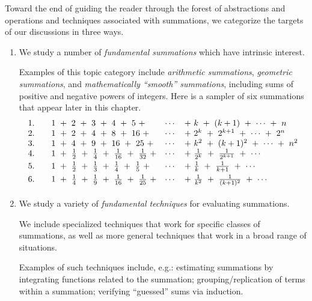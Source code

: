 \bigskip

Toward the end of guiding the reader through the forest of abstractions and operations and techniques associated with summations, we categorize the targets of our discussions in three ways.
\begin{enumerate}
\item
We study a number of {\it fundamental summations} which have intrinsic interest.

\smallskip

Examples of this topic category include {\it arithmetic summations}, {\it geometric summations}, and {\it mathematically ``smooth'' summations}, including sums of positive and negative powers of integers.  Here is a sampler of six summations that appear later in this chapter.
\[
\begin{array}{lclcl}
1.  & &
1 \ + \ 2 \ + \ 3 \ + \ 4 \ + \ 5 \ + & \cdots & + \ k  \ + \ (k+1) \ + \ \cdots \ + \ n \\
2. & &
1 \ + \ 2 \ + \ 4 \ + \ 8 \ + \ 16 \ + & \cdots & + \ 2^k  \ + \ 2^{k+1} \ + \ \cdots \ + \ 2^n \\
3. & &
1 \ + \ 4 \ + \ 9 \ + \ 16 \ + \ 25 \ + & \cdots & + \ k^2  \ + \ (k+1)^2 \ + \ \cdots \ + \ n^2 \\
\smallskip
4. & &
1 \ + \ \frac{1}{2} \ + \ \frac{1}{4} \ + \ \frac{1}{16} \ + \ \frac{1}{32} \ + & \cdots & + \ \frac{1}{2^k}  \ + \ \frac{1}{2^{k+1}} \ + \ \cdots \\
\smallskip
5. & &
1 \ + \ \frac{1}{2} \ + \ \frac{1}{3} \ + \ \frac{1}{4} \ + \ \frac{1}{5} \ + & \cdots & + \ \frac{1}{k}  \ + \ \frac{1}{k+1} \ + \ \cdots \\
\smallskip
6. & &
1 \ + \ \frac{1}{4} \ + \ \frac{1}{9} \ + \ \frac{1}{16} \ + \ \frac{1}{25} \ + & \cdots & + \ \frac{1}{k^2}  \ + \ \frac{1}{(k+1)^2} \ + \ \cdots
\end{array}
\]

\medskip\item
We study a variety of {\it fundamental techniques} for evaluating summations.

\smallskip

We include specialized techniques that work for specific classes of summations, as well as more general techniques that work in a broad range of situations.

\smallskip

Examples of such techniques include, e.g.: estimating summations by integrating functions related to the summation; grouping/replication of terms within a summation; verifying ``guessed'' sums via induction.


\end{enumerate}
